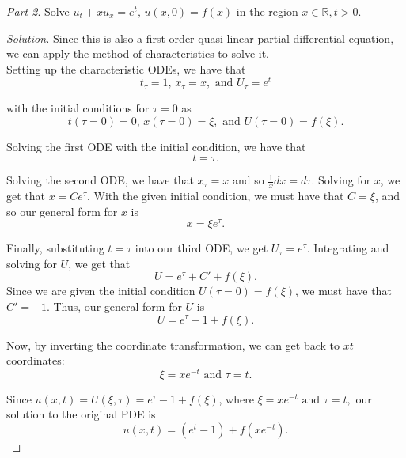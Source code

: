 \documentclass[11pt]{article}
\newenvironment{solution}
  {\renewcommand\qedsymbol{$\blacksquare$}\begin{proof}[Solution]}
  {\end{proof}}
\begin{document}
\newpage

\textit{Part 2}. Solve $u_t + xu_x = e^t, \, u(x, 0) = f(x)$ in the region $x\in \mathbb{R}, t > 0.$
\begin{solution} 
Since this is also a first-order quasi-linear partial differential equation, we can apply the method of characteristics to solve it. \\

Setting up the characteristic ODEs, we have that $$ t_\tau = 1, \, x_\tau = x, \text { and } U_\tau = e^t$$

with the initial conditions for $\tau = 0$ as $$ t(\tau = 0) = 0, \, x(\tau = 0) = \xi, \text { and } U(\tau = 0) = f(\xi).$$

Solving the first ODE with the initial condition, we have that $$t = \tau.$$ 

Solving the second ODE, we have that $x_\tau = x$ and so $\frac{1}{x} dx = d\tau.$ Solving for $x$, we get that $x = Ce^{\tau}.$ With the given initial condition, we must have that $C = \xi$, and so our general form for $x$ is $$x = \xi e^{\tau}.$$

Finally, substituting $t = \tau$ into our third ODE, we get $U_\tau = e^{\tau}.$ Integrating and solving for $U$, we get that $$U = e^{\tau} + C' + f(\xi).$$ Since we are given the initial condition $U(\tau = 0) = f(\xi)$, we must have that $C' = -1.$ Thus, our general form for $U$ is $$U = e^{\tau} - 1 + f(\xi).$$

Now, by inverting the coordinate transformation, we can get back to $xt$ coordinates: $$\xi = xe^{-t} \text { and } \tau = t.$$

Since $u(x, t) = U(\xi, \tau) = e^{\tau} - 1 + f(\xi)$, where $\xi = xe^{-t} \text { and } \tau = t,$ our solution to the original PDE is $$\boxed{u(x, t) = (e^t - 1) + f\left(xe^{-t}\right)}.$$

\end{solution}
\end{document}
